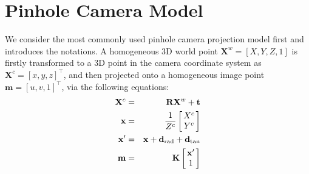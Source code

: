\documentclass{report}
\begin{document}
\section{Pinhole Camera Model}
\label{pinholeSec}
We consider the most commonly used pinhole camera projection model first and introduces the notations. A homogeneous 3D world point $\mathbf{X}^w = [X, Y, Z, 1]$ is firstly transformed to a 3D point in the camera coordinate system as $\mathbf{X}^c = [x, y, z]^\top$, and then projected onto a homogeneous image point $\mathbf{m} = [u, v, 1]^\top$, via the following equations: 
\begin{eqnarray}
\label{cmEqn1}
\mathbf{X}^c &=&
\mathbf{R} \mathbf{X}^w + \mathbf{t} \\
\mathbf{x} &=& \frac{1}{Z^c} 
\arraycolsep=1.5pt%
\begin{bmatrix}
\begin{array}{c}
X^c \\ Y^c
\end{array}
\label{rayEqn}
\end{bmatrix} \\
\mathbf{x}' &=& \mathbf{x} + \mathbf{d}_\text{rad} + \mathbf{d}_\text{tan} \label{distEqn0}\\
\mathbf{m} &=&
\mathbf{K}
\arraycolsep=1.5pt%
\begin{bmatrix}
	\begin{array}{c}
	\mathbf{x}'\\ 1
	\end{array}
\end{bmatrix}
\label{cmEqn4} 
\end{eqnarray}
\end{document}
